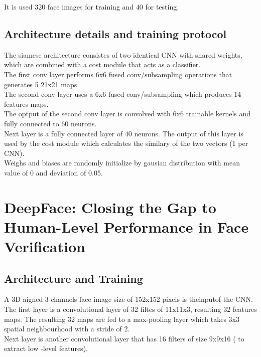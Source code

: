 \documentclass[a4paper]{article}
\begin{document}
It is used 320 face images for training and 40 for testing.\\

\subsection{Architecture details and training protocol}
The siamese architecture consistes of two identical CNN with shared weights, which are combined with a cost module that acts as a classifier.\\

The first conv layer performs 6x6 fused conv/subsampling operations that generates 5 21x21 maps.\\

The second conv layer uses a 6x6 fused conv/subsampling which produces 14 features maps.\\

The optput of the second conv layer is convolved with 6x6 trainable kernels  and fully connected to 60 neurons.\\

Next layer is a fully connected layer of 40 neurons. The output of this layer is used by the cost module which calculates the similary of the two vectors (1 per CNN).\\

Weighs and biases are randomly initialize by gausian distribution with mean value of 0 and deviation of 0.05.\\

\section{DeepFace: Closing the Gap to Human-Level Performance in Face Verification}

\subsection{Architecture and Training}

A 3D aigned 3-channels face image size of 152x152 pixels is theinputof the CNN. The first layer is a convolutional layer of 32 filtes of 11x11x3, resulting 32 features maps. The resulting 32 maps are fed to a max-pooling layer which takes  3x3 spatial neighbourhood with a stride of 2.\\

Next layer is another convolutional layer that has 16 filters of size 9x9x16 ( to extract low -level features).\\
\end{document}
